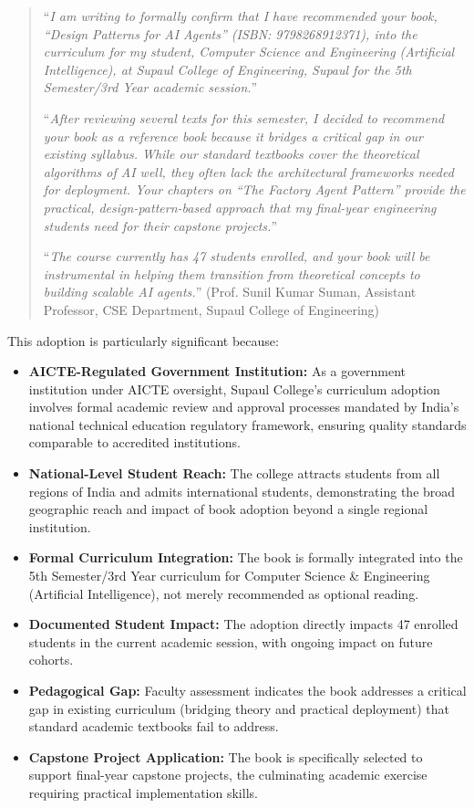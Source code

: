 \begin{quote}
``\textit{I am writing to formally confirm that I have recommended your book, ``Design Patterns for AI Agents'' (ISBN: 9798268912371), into the curriculum for my student, Computer Science and Engineering (Artificial Intelligence), at Supaul College of Engineering, Supaul for the 5th Semester/3rd Year academic session.}''

``\textit{After reviewing several texts for this semester, I decided to recommend your book as a reference book because it bridges a critical gap in our existing syllabus. While our standard textbooks cover the theoretical algorithms of AI well, they often lack the architectural frameworks needed for deployment. Your chapters on ``The Factory Agent Pattern'' provide the practical, design-pattern-based approach that my final-year engineering students need for their capstone projects.}''

``\textit{The course currently has 47 students enrolled, and your book will be instrumental in helping them transition from theoretical concepts to building scalable AI agents.}'' (Prof. Sunil Kumar Suman, Assistant Professor, CSE Department, Supaul College of Engineering) \cite{OR9}
\end{quote}

This adoption is particularly significant because:

\begin{itemize}
    \item \textbf{AICTE-Regulated Government Institution:} As a government institution under AICTE oversight, Supaul College's curriculum adoption involves formal academic review and approval processes mandated by India's national technical education regulatory framework, ensuring quality standards comparable to accredited institutions.
    \item \textbf{National-Level Student Reach:} The college attracts students from all regions of India and admits international students, demonstrating the broad geographic reach and impact of \drs book adoption beyond a single regional institution.
    \item \textbf{Formal Curriculum Integration:} The book is formally integrated into the 5th Semester/3rd Year curriculum for Computer Science \& Engineering (Artificial Intelligence), not merely recommended as optional reading.
    \item \textbf{Documented Student Impact:} The adoption directly impacts 47 enrolled students in the current academic session, with ongoing impact on future cohorts.
    \item \textbf{Pedagogical Gap:} Faculty assessment indicates the book addresses a critical gap in existing curriculum (bridging theory and practical deployment) that standard academic textbooks fail to address.
    \item \textbf{Capstone Project Application:} The book is specifically selected to support final-year capstone projects, the culminating academic exercise requiring practical implementation skills.
\end{itemize}


